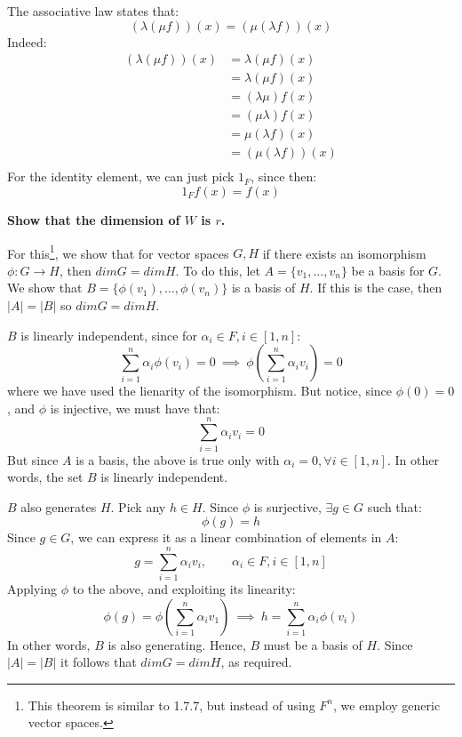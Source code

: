\documentclass{exam}
\begin{document}
\begin{questions}
The associative law states that:
\[
(\lambda(\mu f))(x) = (\mu(\lambda f))(x)
\]
Indeed:
\begin{align*}
    (\lambda(\mu f))(x) &= \lambda (\mu f)(x) \\
                        &= \lambda (\mu f)(x) \\
                        &= (\lambda \mu) f(x) \\
                        &= (\mu \lambda) f(x) \\
                        &= \mu (\lambda f)(x) \\
                        &= (\mu (\lambda f))(x) \\
\end{align*}
For the identity element, we can just pick $1_F$, since then:
\[
1_Ff(x) = f(x)
\]

\question \textbf{Show that the dimension of $W$ is $r$.}

\bigskip

For this\footnote{This theorem is similar to 1.7.7, but instead of using $F^n$, we employ generic vector spaces.}, we show that for vector spaces $G,H$ if there exists an isomorphism $\phi : G \to H$, then $dim G = dim H$. To do this, let $A = \{v_1, \ldots, v_n\}$ be a basis for $G$. We show that $B = \{\phi(v_1), \ldots, \phi(v_n)\}$ is a basis of $H$. If this is the case, then $|A| = |B|$ so $dim G = dim H$.

\smallskip

$B$ is linearly independent, since for $\alpha_i \in F, i \in [1,n]$:
\[
\sum_{i = 1}^n \alpha_i \phi(v_i) = 0 \ \implies \ \phi\left(\sum_{i = 1}^n \alpha_i v_i\right) = 0
\]
where we have used the lienarity of the isomorphism. But notice, since $\phi(0) = 0$, and $\phi$ is injective, we must have that:
\[
\sum_{i = 1}^n \alpha_i v_i = 0
\]
But since $A$ is a basis, the above is true only with $\alpha_i = 0, \forall i \in [1,n]$. In other words, the set $B$ is linearly independent.

\smallskip

$B$ also generates $H$. Pick any $h \in H$. Since $\phi$ is surjective, $\exists g \in G$ such that:
\[
\phi(g) = h
\]
Since $g \in G$, we can express it as a linear combination of elements in $A$:
\[
g = \sum_{i = 1}^n \alpha_i v_i, \qquad \alpha_i \in F, i \in [1,n]
\]
Applying $\phi$ to the above, and exploiting its linearity:
\[
\phi(g) = \phi\left(\sum_{i = 1}^n \alpha_i v_1\right) \ \implies \ h = \sum_{i = 1}^n \alpha_i \phi(v_i)
\]
In other words, $B$ is also generating. Hence, $B$ must be a basis of $H$. Since $|A| = |B|$ it follows that $dim G = dim H$, as required.


\end{questions}
\end{document}
